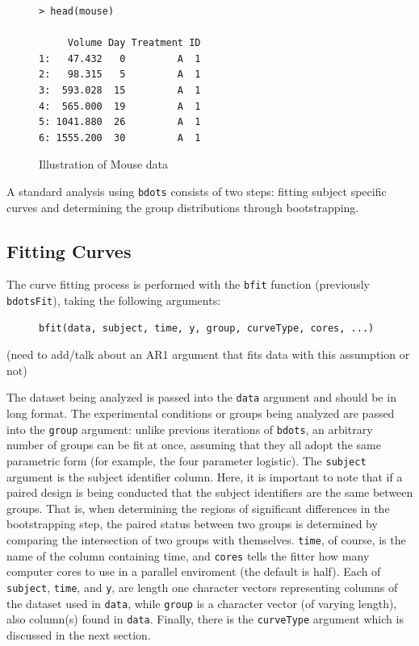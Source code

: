 \documentclass{article}
\newcommand{\xt}{\texttt}%
\begin{document}
\begin{singlespace}
\begin{figure}
\centering
\begin{BVerbatim}
> head(mouse)

     Volume Day Treatment ID
1:   47.432   0         A  1
2:   98.315   5         A  1
3:  593.028  15         A  1
4:  565.000  19         A  1
5: 1041.880  26         A  1
6: 1555.200  30         A  1
\end{BVerbatim}
\caption{Illustration of Mouse data}
\label{fig:mouse_head}
\end{figure}
\end{singlespace}

A standard analysis using \xt{bdots} consists of two steps: fitting subject specific curves and determining the group distributions through bootstrapping.

\subsection{Fitting Curves}

The curve fitting process is performed with the \texttt{bfit} function (previously \texttt{bdotsFit}), taking the following arguments:

\begin{singlespace}
\begin{figure}[h!]
\centering
\begin{BVerbatim}
bfit(data, subject, time, y, group, curveType, cores, ...)
\end{BVerbatim}
\end{figure}
\end{singlespace}

(need to add/talk about an AR1 argument that fits data with this assumption or not)

The dataset being analyzed is passed into the \xt{data} argument and should be in long format. The experimental conditions or groups being analyzed are passed into the \xt{group} argument: unlike previous iterations of \xt{bdots}, an arbitrary number of groups can be fit at once, assuming that they all adopt the same parametric form (for example, the four parameter logistic). The \xt{subject} argument is the subject identifier column. Here, it is important to note that if a paired design is being conducted that the subject identifiers are the same between groups. That is, when determining the regions of significant differences in the bootstrapping step, the paired status between two groups is determined by comparing the intersection of two groups with themselves. \xt{time}, of course, is the name of the column containing time, and \xt{cores} tells the fitter how many computer cores to use in a parallel enviroment (the default is half). Each of \xt{subject}, \xt{time}, and \xt{y}, are length one character vectors representing columns of the dataset used in \xt{data}, while \xt{group} is a character vector (of varying length), also column(s) found in \xt{data}. Finally, there is the \xt{curveType} argument which is discussed in the next section.
\end{document}
